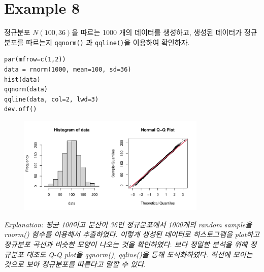 \documentclass{article}
\begin{document}
\section*{Example 8}
정규분포 $N(100,36)$을 따르는 1000 개의 데이터를 생성하고, 생성된 데이터가 정규분포를 따르는지 \texttt{qqnorm()} 과 \texttt{qqline()}을 이용하여 확인하자. 
\begin{lstlisting}[style={r-style}]
par(mfrow=c(1,2))
data = rnorm(1000, mean=100, sd=36)
hist(data)
qqnorm(data)
qqline(data, col=2, lwd=3)
dev.off()
\end{lstlisting}
\begin{figure}[htb!]
    \centering
    \includegraphics[width=0.8\textwidth]{fig/ex8.pdf}
\end{figure}
\emph{Explanation: 평균 100이고 분산이 36인 정규분포에서 1000개의 random sample을 rnorm() 함수를 이용해서 추출하였다. 이렇게 생성된 데이터로 히스토그램을 plot하고 정규분포 곡선과 비슷한 모양이 나오는 것을 확인하였다. 보다 정밀한 분석을 위해 정규분포 대조도 Q-Q plot을 qqnorm(), qqline()을 통해 도식화하였다. 직선에 모이는 것으로 보아 정규분포를 따른다고 말할 수 있다.} \\
\end{document}
